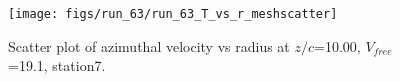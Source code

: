 \begin{figure}[H]
\centering
\texttt{[image: figs/run\_63/run\_63\_T\_vs\_r\_meshscatter]}
\caption{Scatter plot of azimuthal velocity vs radius at $z/c$=10.00, $V_{free}$=19.1, station7.}
\label{fig:run_63_T_vs_r_meshscatter}
\end{figure}


